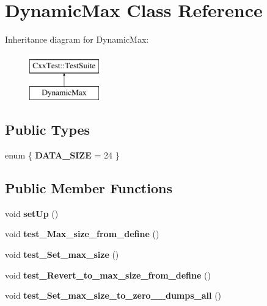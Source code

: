 \hypertarget{classDynamicMax}{\section{Dynamic\-Max Class Reference}
\label{classDynamicMax}
}
Inheritance diagram for Dynamic\-Max\-:\begin{figure}[H]
\begin{center}
\leavevmode
\includegraphics[height=2.000000cm]{classDynamicMax}
\end{center}
\end{figure}
\subsection*{Public Types}
\begin{DoxyCompactItemize}
\item 
enum \{ {\bfseries D\-A\-T\-A\-\_\-\-S\-I\-Z\-E} = 24
 \}
\end{DoxyCompactItemize}
\subsection*{Public Member Functions}
\begin{DoxyCompactItemize}
\item 
\hypertarget{classDynamicMax_a6ef2b80d5b2b70e9d32c41361ff5a30c}{void {\bfseries set\-Up} ()}\label{classDynamicMax_a6ef2b80d5b2b70e9d32c41361ff5a30c}

\item 
\hypertarget{classDynamicMax_af78ea919f278a663aef09a9adf93f010}{void {\bfseries test\-\_\-\-Max\-\_\-size\-\_\-from\-\_\-define} ()}\label{classDynamicMax_af78ea919f278a663aef09a9adf93f010}

\item 
\hypertarget{classDynamicMax_aab7c9b0ecc72d795e4935eaa53e83b6f}{void {\bfseries test\-\_\-\-Set\-\_\-max\-\_\-size} ()}\label{classDynamicMax_aab7c9b0ecc72d795e4935eaa53e83b6f}

\item 
\hypertarget{classDynamicMax_a851765fa33488833e3fd4ba5a386f3f4}{void {\bfseries test\-\_\-\-Revert\-\_\-to\-\_\-max\-\_\-size\-\_\-from\-\_\-define} ()}\label{classDynamicMax_a851765fa33488833e3fd4ba5a386f3f4}

\item 
\hypertarget{classDynamicMax_af50d3b8128f9f901fcecfbf8a6d9e36e}{void {\bfseries test\-\_\-\-Set\-\_\-max\-\_\-size\-\_\-to\-\_\-zero\-\_\-\-\_\-dumps\-\_\-all} ()}\label{classDynamicMax_af50d3b8128f9f901fcecfbf8a6d9e36e}

\end{DoxyCompactItemize}
